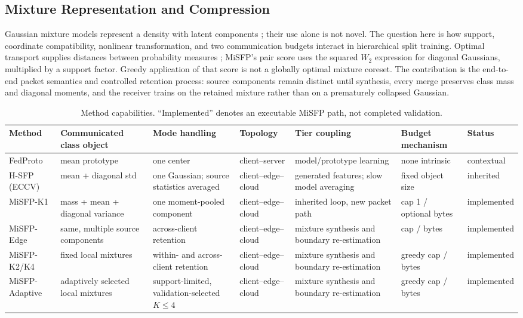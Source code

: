 \subsection{Mixture Representation and Compression}
Gaussian mixture models represent a density with latent components \cite{mclachlan2000finite}; their use alone is not novel. The question here is how support, coordinate compatibility, nonlinear transformation, and two communication budgets interact in hierarchical split training. Optimal transport supplies distances between probability measures \cite{villani2009optimal}; MiSFP's pair score uses the squared $W_2$ expression for diagonal Gaussians, multiplied by a support factor. Greedy application of that score is not a globally optimal mixture coreset. The contribution is the end-to-end packet semantics and controlled retention process: source components remain distinct until synthesis, every merge preserves class mass and diagonal moments, and the receiver trains on the retained mixture rather than on a prematurely collapsed Gaussian.

\begin{table}[t]
\caption{Method capabilities. ``Implemented'' denotes an executable MiSFP path, not completed validation.}
\label{tab:extension}
\centering\small
\begin{tabularx}{\textwidth}{lXXXXXX}
\toprule
Method & Communicated class object & Mode handling & Topology & Tier coupling & Budget mechanism & Status\\
\midrule
FedProto & mean prototype & one center & client--server & model/prototype learning & none intrinsic & contextual\\
H-SFP (ECCV) & mean + diagonal std & one Gaussian; source statistics averaged & client--edge--cloud & generated features; slow model averaging & fixed object size & inherited\\
MiSFP-K1 & mass + mean + diagonal variance & one moment-pooled component & client--edge--cloud & inherited loop, new packet path & cap 1 / optional bytes & implemented\\
MiSFP-Edge & same, multiple source components & across-client retention & client--edge--cloud & mixture synthesis and boundary re-estimation & cap / bytes & implemented\\
MiSFP-K2/K4 & fixed local mixtures & within- and across-client retention & client--edge--cloud & mixture synthesis and boundary re-estimation & greedy cap / bytes & implemented\\
MiSFP-Adaptive & adaptively selected local mixtures & support-limited, validation-selected $K\le4$ & client--edge--cloud & mixture synthesis and boundary re-estimation & greedy cap / bytes & implemented\\
\bottomrule
\end{tabularx}
\end{table}
